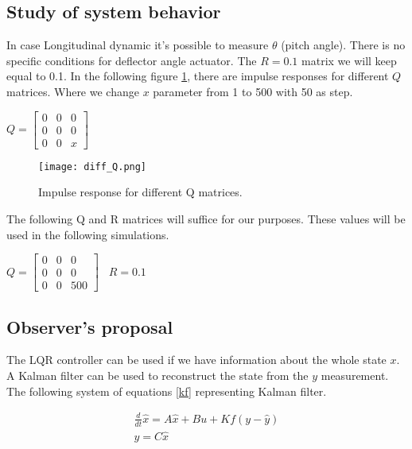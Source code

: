 \documentclass[../report.tex]{subfiles}
\begin{document}
\subsection{Study of system behavior}

In case Longitudinal dynamic it's possible to measure $\theta$ (pitch
angle). There is no specific conditions for deflector angle actuator. The
$R = 0.1$ matrix we will keep equal to 0.1. In the following figure
\ref{fig:diff_Q}, there are impulse responses for 
different $Q$ matrices. Where we change $x$ parameter from 1 to 500 with 50 as
step.


$Q = \begin{bmatrix}  0 & 0 & 0 \\
                      0 & 0 & 0 \\
                      0 & 0 & x \end{bmatrix}$ \\

\begin{figure}[hbt!]
    \centering
    \texttt{[image: diff\_Q.png]}
    \caption{Impulse response for different Q matrices.}
    \label{fig:diff_Q}
\end{figure}
The following Q and R matrices will suffice for our purposes. These values
will be used in the following simulations.

$Q = \begin{bmatrix}  0 & 0 & 0 \\
                      0 & 0 & 0 \\
                      0 & 0 & 500 \end{bmatrix}$  \
$R = 0.1$


\subsection{Observer's proposal}
The LQR controller can be used if we have information about the whole
state $x$. A Kalman filter can be used to reconstruct the state from the
$y$ measurement. The following system of equations \ref{kf} representing Kalman filter.

\begin{equation}\label{kf}
    \begin{split}
        \frac{d}{dt}\hat{x} = A\hat{x} + Bu + Kf(y-\hat{y})\\
        \hat{y} = C\hat{x}
    \end{split}
\end{equation}
\end{document}
